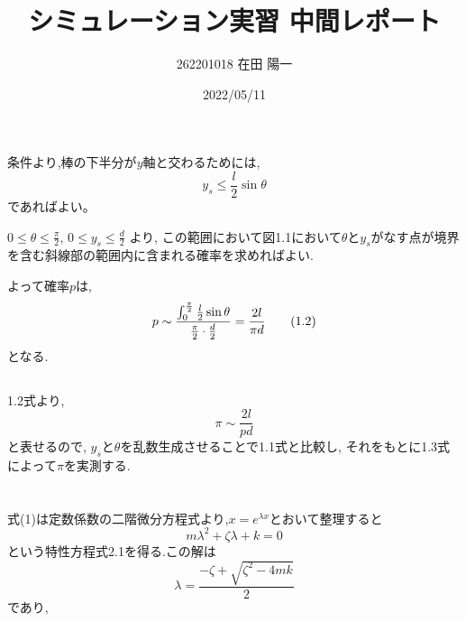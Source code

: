 \documentclass[a4paper]{jarticle}
\begin{document}
\title{シミュレーション実習 中間レポート}
\author{262201018 在田 陽一}
\date{2022/05/11}
\maketitle


\section{}
\subsection{}
\noindent
条件より,棒の下半分が$y$軸と交わるためには,
\begin{equation}
     y_s \leq \frac{l}{2}\sin\theta \tag{1.1}
\end{equation}
であればよい。

\noindent
$0 \leq \theta \leq \frac{\pi}{2}$, $0 \leq y_s \leq \frac{d}{2}$ より,
この範囲において図1.1において$\theta$と$y_s$がなす点が境界を含む斜線部の範囲内に含まれる確率を求めればよい.

\noindent
よって確率$p$は,
\begin{equation}
    p \sim \frac{\int^\frac{\pi}{2}_0 \frac{l}{2}\sin \theta}{\frac{\pi}{2} \cdot \frac{d}{2}} \\
     =\frac{2l}{\pi d} \tag{1.2}
\end{equation}
となる.

\subsection{}
\noindent
1.2式より,
\begin{equation}
   \pi \sim  \frac{2l}{pd} \tag{1.3}
\end{equation}
と表せるので, $y_s$と$\theta$を乱数生成させることで1.1式と比較し,
それをもとに1.3式によって$\pi$を実測する.

\section{}
\subsection{}
\noindent
式(1)は定数係数の二階微分方程式より,$x=e^{\lambda x}$とおいて整理すると
\begin{equation}
    m\lambda^2 + \zeta\lambda + k = 0 \tag{2.1}
\end{equation}
という特性方程式2.1を得る.この解は
\begin{equation}
    \lambda = \frac{-\zeta + \sqrt{\zeta^2 - 4mk}}{2} \tag{2.2}
\end{equation}
であり,

\subsection{}
\noindent
\subsection{}
\noindent
\subsection{}\noindent
\end{document}
